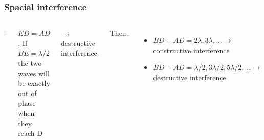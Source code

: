 \documentclass[]{beamer}
\begin{document}
  
  
\begin{frame}%
\frametitle{Spacial interference}


  \begin{columns}[c]
   \column{2in}  %
  
  \begin{center}
  \includegraphics[height=2.in]{images4/soundinterference2.jpg}
\end{center}


   \column{2in}
\pause

  $ED=AD$,  If  $BE=\lambda/2$  the two waves will be exactly out of
phase when they reach D
\pause
\vspace{3mm}

 $\rightarrow$ destructive interference.

\pause
Then..

\begin{itemize}
\item $BD-AD=2\lambda, 3\lambda,...\rightarrow$ constructive interference
\pause

\item $BD-AD=\lambda/2, 3\lambda/2, 5\lambda/2,...\rightarrow$ destructive interference
\end{itemize}


   \end{columns}
  \end{frame}



\end{document}
